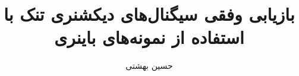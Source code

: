 \documentclass{beamer}
\begin{document}
\title{بازیابی وفقی سیگنال‌های دیکشنری تنک با استفاده از نمونه‌های باینری}
\subtitle{}
\author{حسین بهشتی}


\begin{frame}
\maketitle
\end{frame}



\begin{frame}[t,allowframebreaks]

\begin{latin}

\end{latin}
\end{frame}
\end{document}
